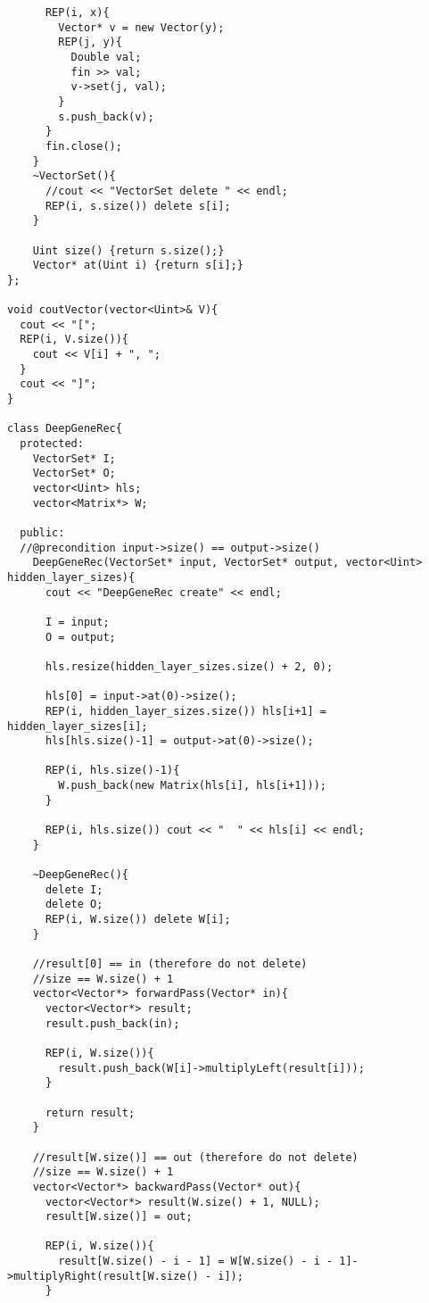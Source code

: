 \begin{lstlisting}
      REP(i, x){
        Vector* v = new Vector(y);
        REP(j, y){
          Double val;
          fin >> val;
          v->set(j, val); 
        }
        s.push_back(v); 
      }
      fin.close(); 
    }
    ~VectorSet(){
      //cout << "VectorSet delete " << endl;
      REP(i, s.size()) delete s[i];
    }
    
    Uint size() {return s.size();}     
    Vector* at(Uint i) {return s[i];}
};

void coutVector(vector<Uint>& V){
  cout << "["; 
  REP(i, V.size()){
    cout << V[i] + ", ";
  }
  cout << "]";  
}

class DeepGeneRec{
  protected:
    VectorSet* I;
    VectorSet* O; 
    vector<Uint> hls; 
    vector<Matrix*> W; 
      
  public:
  //@precondition input->size() == output->size()
    DeepGeneRec(VectorSet* input, VectorSet* output, vector<Uint> hidden_layer_sizes){
      cout << "DeepGeneRec create" << endl;
    
      I = input;
      O = output;
    
      hls.resize(hidden_layer_sizes.size() + 2, 0);
      
      hls[0] = input->at(0)->size();
      REP(i, hidden_layer_sizes.size()) hls[i+1] = hidden_layer_sizes[i];
      hls[hls.size()-1] = output->at(0)->size(); 
      
      REP(i, hls.size()-1){
        W.push_back(new Matrix(hls[i], hls[i+1])); 
      }
      
      REP(i, hls.size()) cout << "  " << hls[i] << endl;
    }
    
    ~DeepGeneRec(){
      delete I;
      delete O;
      REP(i, W.size()) delete W[i];
    }
    
    //result[0] == in (therefore do not delete)
    //size == W.size() + 1 
    vector<Vector*> forwardPass(Vector* in){
      vector<Vector*> result; 
      result.push_back(in); 
      
      REP(i, W.size()){
        result.push_back(W[i]->multiplyLeft(result[i]));
      }
      
      return result; 
    }
    
    //result[W.size()] == out (therefore do not delete)
    //size == W.size() + 1  
    vector<Vector*> backwardPass(Vector* out){
      vector<Vector*> result(W.size() + 1, NULL); 
      result[W.size()] = out; 
      
      REP(i, W.size()){
        result[W.size() - i - 1] = W[W.size() - i - 1]->multiplyRight(result[W.size() - i]); 
      }
      

\end{lstlisting}

